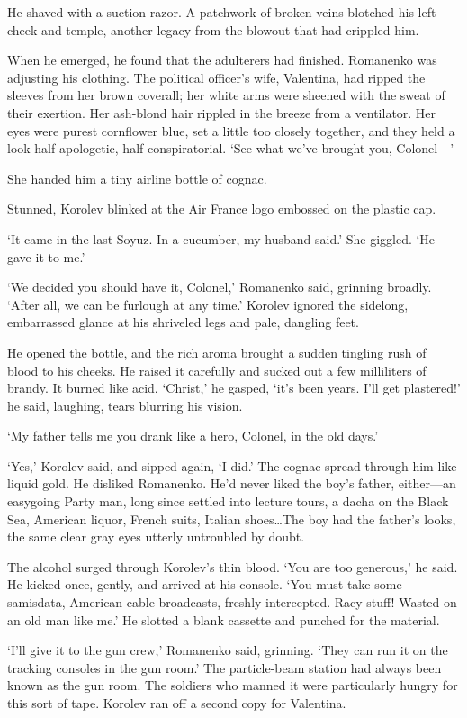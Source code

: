 He shaved with a suction razor. A patchwork of broken veins blotched his left cheek and temple, another legacy from the blowout that had crippled him.

When he emerged, he found that the adulterers had finished. Romanenko was adjusting his clothing. The political officer’s wife, Valentina, had ripped the sleeves from her brown coverall; her white arms were sheened with the sweat of their exertion. Her ash-blond hair rippled in the breeze from a ventilator. Her eyes were purest cornflower blue, set a little too closely together, and they held a look half-apologetic, half-conspiratorial. ‘See what we’ve brought you, Colonel—’

She handed him a tiny airline bottle of cognac.

Stunned, Korolev blinked at the Air France logo embossed on the plastic cap.

‘It came in the last Soyuz. In a cucumber, my husband said.’ She giggled. ‘He gave it to me.’

‘We decided you should have it, Colonel,’ Romanenko said, grinning broadly. ‘After all, we can be furlough at any time.’ Korolev ignored the sidelong, embarrassed glance at his shriveled legs and pale, dangling feet.

He opened the bottle, and the rich aroma brought a sudden tingling rush of blood to his cheeks. He raised it carefully and sucked out a few milliliters of brandy. It burned like acid. ‘Christ,’ he gasped, ‘it’s been years. I’ll get plastered!’ he said, laughing, tears blurring his vision.

‘My father tells me you drank like a hero, Colonel, in the old days.’

‘Yes,’ Korolev said, and sipped again, ‘I did.’ The cognac spread through him like liquid gold. He disliked Romanenko. He’d never liked the boy’s father, either—an easygoing Party man, long since settled into lecture tours, a dacha on the Black Sea, American liquor, French suits, Italian shoes…The boy had the father’s looks, the same clear gray eyes utterly untroubled by doubt.

The alcohol surged through Korolev’s thin blood. ‘You are too generous,’ he said. He kicked once, gently, and arrived at his console. ‘You must take some samisdata, American cable broadcasts, freshly intercepted. Racy stuff! Wasted on an old man like me.’ He slotted a blank cassette and punched for the material.

‘I’ll give it to the gun crew,’ Romanenko said, grinning. ‘They can run it on the tracking consoles in the gun room.’ The particle-beam station had always been known as the gun room. The soldiers who manned it were particularly hungry for this sort of tape. Korolev ran off a second copy for Valentina.

